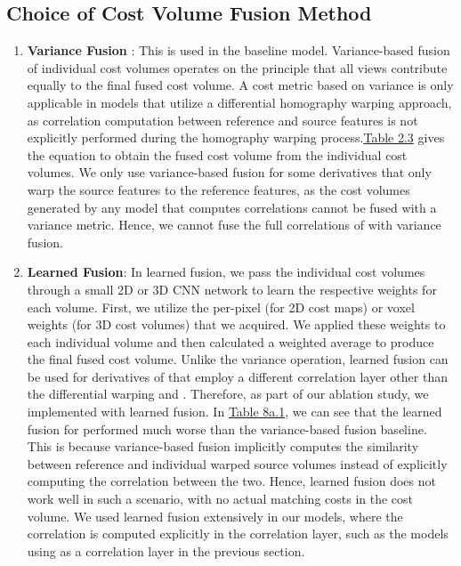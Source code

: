 \subsection{Choice of Cost Volume Fusion Method}\label{subsec:cvf}

\begin{enumerate}
    \item \textbf{Variance Fusion} \cite{Yao2018}: This is used in the baseline {\mvsn} model. Variance-based fusion of individual cost volumes operates on the principle that all views contribute equally to the final fused cost volume. A cost metric based on variance is only applicable in models that utilize a differential homography warping approach, as correlation computation between reference and source features is not explicitly performed during the homography warping process.\hyperref[tab:arch-mvsn]{Table 2.3} gives the equation to obtain the fused cost volume from the individual cost volumes. We only use variance-based fusion for some {\mvsn} derivatives that only warp the source features to the reference features, as the cost volumes generated by any model that computes correlations cannot be fused with a variance metric. Hence, we cannot fuse the full correlations of {\rmvd} with variance fusion.  
    \item \textbf{Learned Fusion}\cite{schroeppel2022benchmark, Hartmann2017}: In learned fusion, we pass the individual cost volumes through a small 2D or 3D CNN network to learn the respective weights for each volume. First, we utilize the per-pixel (for 2D cost maps) or voxel weights (for 3D cost volumes) that we acquired. We applied these weights to each individual volume and then calculated a weighted average to produce the final fused cost volume. Unlike the variance operation, learned fusion can be used for derivatives of {\mvsn} that employ a different correlation layer other than the differential warping and {\rmvd}. Therefore, as part of our ablation study, we implemented {\mvsn} with learned fusion. In \hyperref[tab:cvf]{Table 8a.1}, we can see that the learned fusion for {\mvsn} performed much worse than the variance-based fusion baseline. This is because variance-based fusion implicitly computes the similarity between reference and individual warped source volumes instead of explicitly computing the correlation between the two. Hence, learned fusion does not work well in such a scenario, with no actual matching costs in the cost volume. We used learned fusion extensively in our models, where the correlation is computed explicitly in the correlation layer, such as the {\mvsn} models using {\gwc} as a correlation layer in the previous section. 

\end{enumerate}
